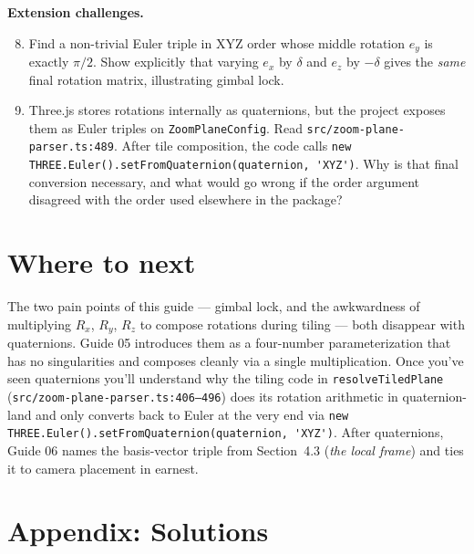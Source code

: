 \documentclass{article}
\begin{document}
\textbf{Extension challenges.}
\begin{enumerate}\setcounter{enumi}{7}
\item Find a non-trivial Euler triple in XYZ order whose middle rotation
$e_y$ is exactly $\pi/2$. Show explicitly that varying $e_x$ by $\delta$ and
$e_z$ by $-\delta$ gives the \emph{same} final rotation matrix, illustrating
gimbal lock.

\item Three.js stores rotations internally as quaternions, but the project
exposes them as Euler triples on \lstinline|ZoomPlaneConfig|. Read
\texttt{src/zoom-plane-parser.ts:489}. After tile composition, the code calls
\lstinline|new THREE.Euler().setFromQuaternion(quaternion, 'XYZ')|. Why is
that final conversion necessary, and what would go wrong if the order
argument disagreed with the order used elsewhere in the package?
\end{enumerate}

\section{Where to next}

The two pain points of this guide --- gimbal lock, and the awkwardness of
multiplying $R_x$, $R_y$, $R_z$ to compose rotations during tiling --- both
disappear with quaternions. Guide 05 introduces them as a four-number
parameterization that has no singularities and composes cleanly via a
single multiplication. Once you've seen quaternions you'll understand why
the tiling code in
\lstinline|resolveTiledPlane| (\texttt{src/zoom-plane-parser.ts:406--496})
does its rotation arithmetic in quaternion-land and only converts back to
Euler at the very end via
\lstinline|new THREE.Euler().setFromQuaternion(quaternion, 'XYZ')|. After
quaternions, Guide 06 names the basis-vector triple from
Section~4.3 (\emph{the local frame}) and ties it to camera placement
in earnest.

\appendix
\section{Appendix: Solutions}
\end{document}
